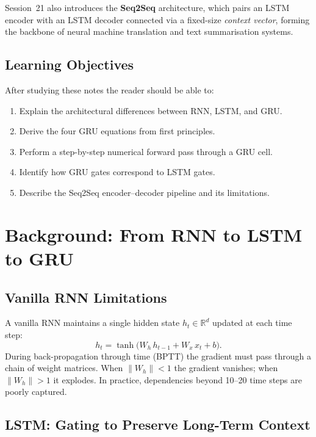 \documentclass[12pt,a4paper]{article}
\begin{document}
Session~21 also introduces the \textbf{Seq2Seq} architecture, which pairs an LSTM encoder with an LSTM
decoder connected via a fixed-size \emph{context vector}, forming the backbone of neural machine
translation and text summarisation systems.

\subsection{Learning Objectives}

After studying these notes the reader should be able to:
\begin{enumerate}[label=\arabic*.]
  \item Explain the architectural differences between RNN, LSTM, and GRU.
  \item Derive the four GRU equations from first principles.
  \item Perform a step-by-step numerical forward pass through a GRU cell.
  \item Identify how GRU gates correspond to LSTM gates.
  \item Describe the Seq2Seq encoder--decoder pipeline and its limitations.
\end{enumerate}

\section{Background: From RNN to LSTM to GRU}
\label{sec:background}

\subsection{Vanilla RNN Limitations}

A vanilla RNN maintains a single hidden state $h_t \in \mathbb{R}^d$ updated at each time step:
\begin{equation}
  h_t = \tanh\!\bigl(W_h\,h_{t-1} + W_x\,x_t + b\bigr).
  \label{eq:rnn}
\end{equation}
During back-propagation through time (BPTT) the gradient must pass through a chain of weight matrices.
When $\|W_h\| < 1$ the gradient vanishes; when $\|W_h\| > 1$ it explodes. In practice, dependencies
beyond 10--20 time steps are poorly captured.

\subsection{LSTM: Gating to Preserve Long-Term Context}
\end{document}
